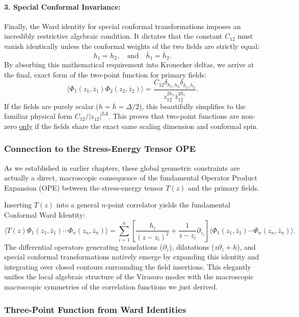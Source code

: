 \paragraph{3. Special Conformal Invariance:}
Finally, the Ward identity for special conformal transformations imposes an incredibly restrictive algebraic condition. It dictates that the constant \( C_{12} \) must vanish identically unless the conformal weights of the two fields are strictly equal:
\[
    h_1 = h_2, \quad \text{and} \quad \bar{h}_1 = \bar{h}_2.
\]
By absorbing this mathematical requirement into Kronecker deltas, we arrive at the final, exact form of the two-point function for primary fields:
\[
    \langle \Phi_1(z_1, \bar{z}_1) \Phi_2(z_2, \bar{z}_2) \rangle = \frac{C_{12} \delta_{h_1, h_2} \delta_{\bar{h}_1, \bar{h}_2}}{z_{12}^{2h_1} \bar{z}_{12}^{2\bar{h}_1}}.
\]
If the fields are purely scalar (\( h = \bar{h} = \Delta/2 \)), this beautifully simplifies to the familiar physical form \( C_{12}/|z_{12}|^{2\Delta} \). This proves that two-point functions are non-zero \uline{only} if the fields share the exact same scaling dimension and conformal spin.

\subsubsection{Connection to the Stress-Energy Tensor OPE}

As we established in earlier chapters, these global geometric constraints are actually a direct, macroscopic consequence of the fundamental Operator Product Expansion (OPE) between the stress-energy tensor \( T(z) \) and the primary fields.

Inserting \( T(z) \) into a general \( n \)-point correlator yields the fundamental Conformal Ward Identity:
\[
    \langle T(z) \Phi_1(z_1, \bar{z}_1) \cdots \Phi_n(z_n, \bar{z}_n) \rangle = \sum_{i=1}^n \left[ \frac{h_i}{(z-z_i)^2} + \frac{1}{z-z_i} \partial_{z_i} \right] \langle \Phi_1(z_1, \bar{z}_1) \cdots \Phi_n(z_n, \bar{z}_n) \rangle.
\]
The differential operators generating translations (\( \partial_z \)), dilatations (\( z\partial_z + h \)), and special conformal transformations natively emerge by expanding this identity and integrating over closed contours surrounding the field insertions. This elegantly unifies the local algebraic structure of the Virasoro modes with the macroscopic macroscopic symmetries of the correlation functions we just derived.

\subsubsection{Three-Point Function from Ward Identities}

